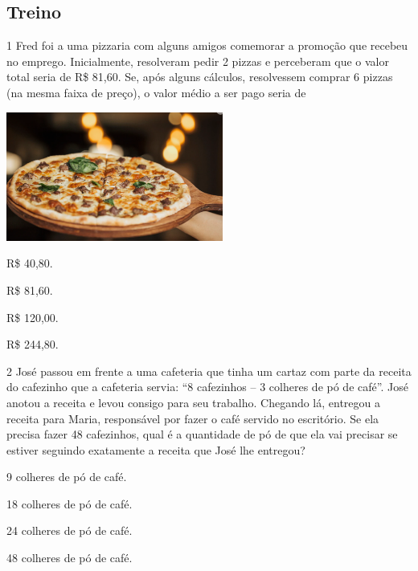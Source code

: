 \begin{mdframed}[linewidth=2pt,linecolor=salmao,roundcorner=2pt]
\begin{escolha}
{\begin{escolha}
\begin{mdframed}[linewidth=2pt,linecolor=salmao,roundcorner=2pt]
\end{mdframed}

\subsection{Treino}

\num{1} Fred foi a uma pizzaria com alguns amigos comemorar a promoção que recebeu no emprego.
Inicialmente, resolveram pedir 2 pizzas e perceberam que o valor total
seria de R\$ 81,60. Se, após alguns cálculos, resolvessem comprar 6
pizzas (na mesma faixa de preço), o valor médio a ser pago seria de

\includegraphics[width=2.80000in,height=1.66867in]{media/image132.png}

\begin{escolha}
\item
  R\$ 40,80.
\item
  R\$ 81,60.
\item
  R\$ 120,00.
\item
  R\$ 244,80.
\end{escolha}


\num{2} José passou em frente a uma cafeteria que tinha um cartaz com parte da
receita do cafezinho que a cafeteria servia: ``8 cafezinhos -- 3 colheres de pó de café''.
José anotou a receita e levou consigo para seu trabalho. Chegando lá,
entregou a receita para Maria, responsável por fazer o café servido no
escritório. Se ela precisa fazer 48 cafezinhos, qual é a
quantidade de pó de que ela vai precisar se estiver seguindo exatamente a
receita que José lhe entregou?

\begin{escolha}
\item
  9 colheres de pó de café.
\item
  18 colheres de pó de café.
\item
  24 colheres de pó de café.
\item
  48 colheres de pó de café.
\end{escolha}


\end{escolha}}
\end{escolha}
\end{mdframed}
